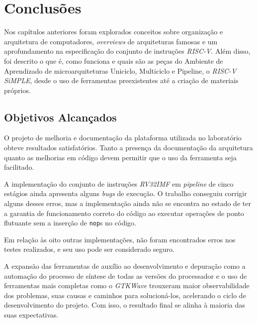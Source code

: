 \chapter{Conclusões}\label{cap5_conclusoes}

{ Nos capítulos anteriores foram explorados conceitos sobre organização e arquitetura
    de computadores, \textit{overviews} de arquiteturas famosas e um aprofundamento
    na especificação do conjunto de instruções \textit{RISC-V}. Além disso, foi
    descrito o que é, como funciona e quais são as peças do Ambiente de Aprendizado
    de microarquiteturas Uniciclo, Multiciclo e Pipeline, o \textit{RISC-V SiMPLE},
    desde o uso de ferramentas preexistentes até a criação de materiais próprios.
}


\section{Objetivos Alcançados}
    { O projeto de melhoria e documentação da plataforma utilizada no laboratório
        obteve resultados satisfatórios. Tanto a presença da documentação da
        arquitetura quanto as melhorias em código devem permitir que o uso da
        ferramenta seja facilitado.
    }

    { A implementação do conjunto de instruções \textit{RV32IMF} em \textit{pipeline}
        de cinco estágios ainda apresenta alguns \textit{bugs} de execução.
        O trabalho conseguiu corrigir alguns desses erros, mas a implementação
        ainda não se encontra no estado de ter a garantia de funcionamento correto
        do código ao executar operações de ponto flutuante sem a inserção de
        \texttt{nop}s no código.
    }

    { Em relação às oito outras implementações, não foram encontrados erros nos
        testes realizados, e seu uso pode ser considerado seguro.
    }

    { A expansão das ferramentas de auxílio ao desenvolvimento e depuração como
        a automação do processo de síntese de todas as versões do processador e
        o uso de ferramentas mais completas como o \textit{GTKWave} trouxeram
        maior observabilidade dos problemas, suas causas e caminhos para solucioná-los,
        acelerando o ciclo de desenvolvimento do projeto. Com isso, o resultado
        final se alinha à maioria das suas expectativas.
    }

\clearpage
